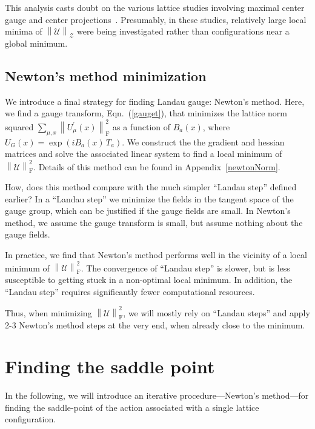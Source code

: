 \documentclass[preprint,aps,prd]{revtex4-2}
\newcommand{\zentrum}{\mathcal{Z}}       %
\newcommand{\config}{\mathcal{U}}
\newcommand\fnorm[1]{\left\lVert #1 \right\rVert_\mathrm{F}}
\begin{document}
This analysis casts doubt on the various lattice studies involving
maximal center gauge and center projections~\cite{
del_debbio_center_1997,del_debbio_detection_1998,de_forcrand_relevance_1999}.
Presumably, in these studies, relatively large local minima of
$\left\lVert \config \right\rVert_\zentrum$ were being investigated
rather than configurations near a global minimum.


\subsection{Newton's method minimization}

We introduce a final strategy for finding Landau gauge:
Newton's method.  Here, we find a gauge transform, Eqn.~(\ref{gauget}),
that minimizes the lattice norm squared $\sum_{\mu,x}\fnorm{U_\mu^\prime(x)}^2$
as a function of $B_a(x)$,
where $U_G(x) = \exp\left(i B_a(x)\, T_a\right)$.
We construct the the gradient and hessian matrices
and solve the associated linear system to find a local minimum of
$\fnorm{\config}^2$.
Details of this method can be found in Appendix~\ref{newtonNorm}.

How, does this method compare with the much simpler ``Landau step'' defined
earlier?  In a ``Landau step'' we minimize the fields in the tangent space
of the gauge group, which can be justified if the gauge fields are small.
In Newton's method, we assume the gauge transform is small, but
assume nothing about the gauge fields.

In practice, we find that Newton's method performs well in the
vicinity of a local minimum of $\fnorm{\config}^2$.
The convergence of ``Landau step'' is slower, but is less susceptible
to getting stuck in a non-optimal local minimum.  In addition,
the ``Landau step'' requires significantly fewer computational resources.

Thus, when minimizing $\fnorm{\config}^2$, we will mostly rely
on ``Landau steps'' and apply 2-3 Newton's method steps at the very end,
when already close to the minimum.

\section{Finding the saddle point}
\label{saddlePoint}

In the following, we will introduce an iterative
procedure---Newton's method---for finding the saddle-point
of the action associated with a single lattice configuration.
\end{document}
